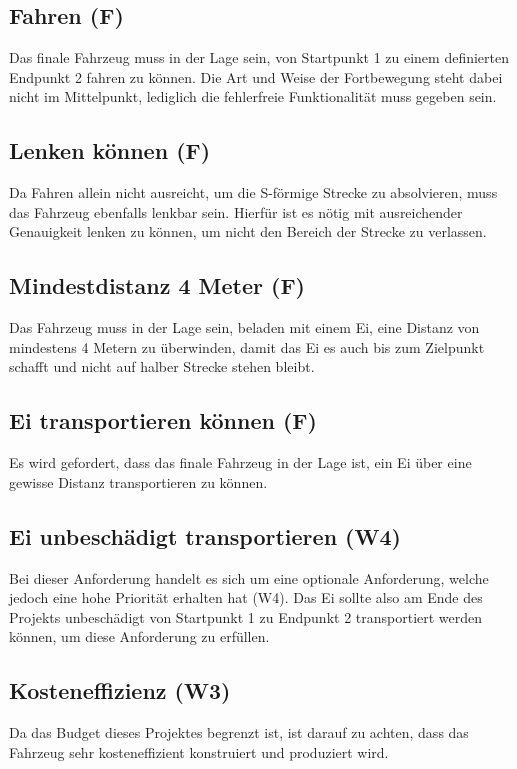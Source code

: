 \subsection*{Fahren (F)}
Das finale Fahrzeug muss in der Lage sein, von Startpunkt 1 zu einem definierten Endpunkt 2 fahren zu können. Die Art und Weise der Fortbewegung steht dabei nicht im Mittelpunkt, lediglich die fehlerfreie Funktionalität muss gegeben sein.

\subsection*{Lenken können (F)}
Da Fahren allein nicht ausreicht, um die S-förmige Strecke zu absolvieren, muss das Fahrzeug ebenfalls lenkbar sein. Hierfür ist es nötig mit ausreichender Genauigkeit lenken zu können, um nicht den Bereich der Strecke zu verlassen.

\subsection*{Mindestdistanz 4 Meter (F)}
Das Fahrzeug muss in der Lage sein, beladen mit einem Ei, eine Distanz von mindestens 4 Metern zu überwinden, damit das Ei es auch bis zum Zielpunkt schafft und nicht auf halber Strecke stehen bleibt.

\subsection*{Ei transportieren können (F)}
Es wird gefordert, dass das finale Fahrzeug in der Lage ist, ein Ei über eine gewisse Distanz transportieren zu können.

\subsection*{Ei unbeschädigt transportieren (W4)}
Bei dieser Anforderung handelt es sich um eine optionale Anforderung, welche jedoch eine hohe Priorität erhalten hat (W4). Das Ei sollte also am Ende des Projekts unbeschädigt von Startpunkt 1 zu Endpunkt 2 transportiert werden können, um diese Anforderung zu erfüllen.

\subsection*{Kosteneffizienz (W3)}
Da das Budget dieses Projektes begrenzt ist, ist darauf zu achten, dass das Fahrzeug sehr kosteneffizient konstruiert und produziert wird.


